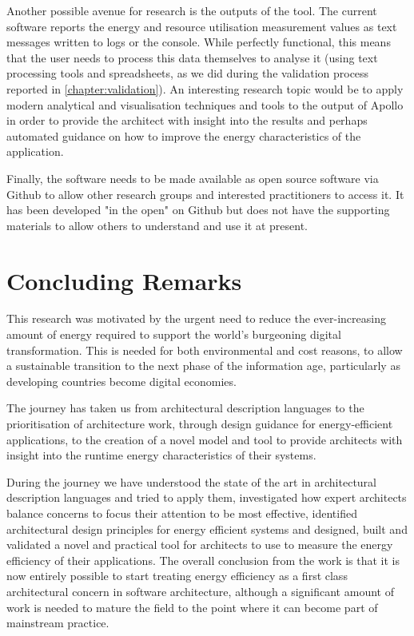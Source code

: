 Another possible avenue for research is the outputs of the tool.  The current software reports the energy and resource utilisation measurement values as text messages written to logs or the console.  While perfectly functional, this means that the user needs to process this data themselves to analyse it (using text processing tools and spreadsheets, as we did during the validation process reported in \cref{chapter:validation}).  An interesting research topic would be to apply modern analytical and visualisation techniques and tools to the output of Apollo in order to provide the architect with insight into the results and perhaps automated guidance on how to improve the energy characteristics of the application.

Finally, the software needs to be made available as open source software via Github to allow other research groups and interested practitioners to access it.  It has been developed "in the open" on Github but does not have the supporting materials to allow others to understand and use it at present.

\section{Concluding Remarks}

This research was motivated by the urgent need to reduce the ever-increasing amount of energy required to support the world's burgeoning digital transformation.  This is needed for both environmental and cost reasons, to allow a sustainable transition to the next phase of the information age, particularly as developing countries become digital economies.

The journey has taken us from architectural description languages to the prioritisation of architecture work, through design guidance for energy-efficient applications, to the creation of a novel model and tool to provide architects with insight into the runtime energy characteristics of their systems.

During the journey we have understood the state of the art in architectural description languages and tried to apply them, investigated how expert architects balance concerns to focus their attention to be most effective, identified architectural design principles for energy efficient systems and designed, built and validated a novel and practical tool for architects to use to measure the energy efficiency of their applications.  The overall conclusion from the work is that it is now entirely possible to start treating energy efficiency as a first class architectural concern in software architecture, although a significant amount of work is needed to mature the field to the point where it can become part of mainstream practice.

